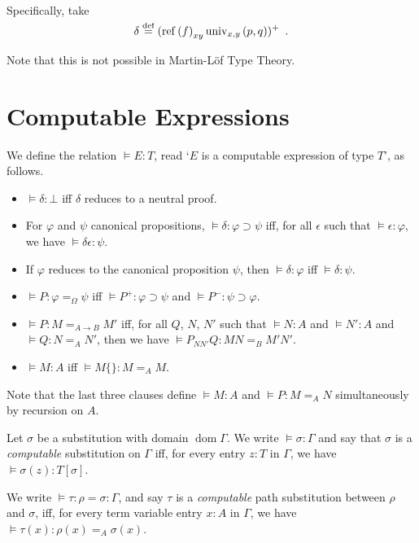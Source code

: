 \documentclass[a4paper,UKenglish]{lipics-v2016}
\newcommand*{\eqdef}{\mathrel{\smash{\stackrel{\text{def}}{=}}}}
\newcommand*{\reff}[1]{\ensuremath{\mathrm{ref} \left( {#1} \right)}}
\newcommand*{\univ}[4]{\ensuremath{\mathrm{univ}_{{#1}, {#2}} \left({#3} , {#4} \right)}}
\newcommand*{\dom}{\ensuremath{\operatorname{dom}}}
\theoremstyle{plain}
\theoremstyle{definition}
\begin{document}
Specifically, take
\[ \delta \eqdef (\reff{f}_{xy} \univ{x}{y}{p}{q})^+ \enspace . \]

Note that this is not possible in Martin-L\"{o}f Type Theory.

\section{Computable Expressions}
\label{section:computable}

\begin{definition}
We define the relation $\models E : T$, read `$E$ is a computable expression of type $T$', as follows.
\begin{itemize}
\item
$\models \delta : \bot$ iff $\delta$ reduces to a neutral proof.
\item
For $\varphi$ and $\psi$ canonical propositions, $\models \delta : \varphi \supset \psi$ iff, for all $\epsilon$ such that $\models \epsilon : \varphi$, we have $\models \delta \epsilon : \psi$.
\item
If $\varphi$ reduces to the canonical proposition $\psi$, then $\models \delta : \varphi$ iff $\models \delta : \psi$.
\item
$\models P : \varphi =_\Omega \psi$ iff $\models P^+ : \varphi \supset \psi$ and $\models P^- : \psi \supset \varphi$.
\item
$\models P : M =_{A \rightarrow B} M'$ iff, for all $Q$, $N$, $N'$ such that $\models N : A$ and $\models N' : A$ and $\models Q : N =_A N'$, then we have $\models P_{NN'}Q : MN =_B M'N'$.
\item
$\models M : A$ iff $\models M \{\} : M =_A M$.
\end{itemize}
Note that the last three clauses define $\models M : A$ and $\models P : M =_A N$ simultaneously by recursion on $A$.
\end{definition}

\begin{definition}
Let $\sigma$ be a substitution with domain $\dom \Gamma$.  We write $\models \sigma : \Gamma$ and say that
$\sigma$ is a \emph{computable} substitution on $\Gamma$ iff, for every entry $z : T$ in $\Gamma$, we have $\models \sigma(z) : T [ \sigma ]$.

We write $\models \tau : \rho = \sigma : \Gamma $, and say $\tau$ is a \emph{computable} path substitution between $\rho$ and $\sigma$, iff, for every term variable entry $x : A$ in $\Gamma$, we have $\models \tau(x) : \rho(x) =_A \sigma(x)$.
\end{definition}
\end{document}
